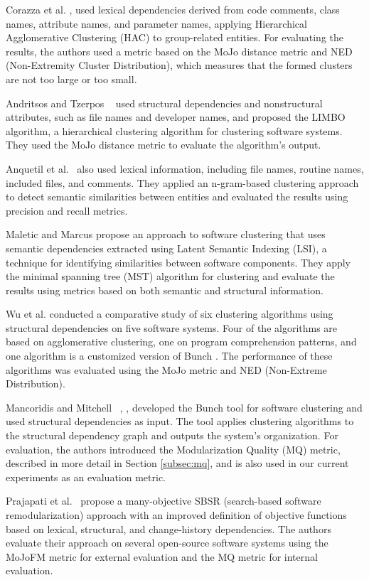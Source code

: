 \documentclass[12pt, a4paper, twoside]{report}
\begin{document}
Corazza et al. \cite{b13}, \cite{corazza2} used lexical dependencies derived from code comments, class names, attribute names, and parameter names, applying Hierarchical Agglomerative Clustering (HAC) to group-related entities. For evaluating the results, the authors used a metric based on the MoJo distance metric and NED (Non-Extremity Cluster Distribution), which measures that the formed clusters are not too large or too small.

Andritsos and Tzerpos ~\cite{tzerpos1} used structural dependencies and nonstructural attributes, such as file names and developer names, and proposed the LIMBO algorithm, a hierarchical clustering algorithm for clustering software systems. They used the MoJo distance metric to evaluate the algorithm's output.

Anquetil et al.~\cite{b14} also used lexical information, including file names, routine names, included files, and comments. They applied an n-gram-based clustering approach to detect semantic similarities between entities and evaluated the results using precision and recall metrics.

Maletic and Marcus \cite{maletic} propose an approach to software clustering that uses semantic dependencies extracted using Latent Semantic Indexing (LSI), a technique for identifying similarities between software components. They apply the minimal spanning tree (MST) algorithm for clustering and evaluate the results using metrics based on both semantic and structural information.

Wu et al. \cite{wu} conducted a comparative study of six clustering algorithms using structural dependencies on five software systems. Four of the algorithms are based on agglomerative clustering, one on program comprehension patterns, and one algorithm is a customized version of Bunch \cite{b10}. The performance of these algorithms was evaluated using the MoJo metric and NED (Non-Extreme Distribution).

Mancoridis and Mitchell ~\cite{b10}, \cite{b101}, \cite{bunch} developed the Bunch tool for software clustering and used structural dependencies as input. The tool applies clustering algorithms to the structural dependency graph and outputs the system's organization. For evaluation, the authors introduced the Modularization Quality (MQ) metric, described in more detail in Section \ref{subsec:mq}, and is also used in our current experiments as an evaluation metric.


Prajapati et al.~\cite{b18} propose a many-objective SBSR (search-based software remodularization) approach with an improved definition of objective functions based on lexical, structural, and change-history dependencies. The authors evaluate their approach on several open-source software systems using the MoJoFM metric for external evaluation and the MQ metric for internal evaluation.
\end{document}
